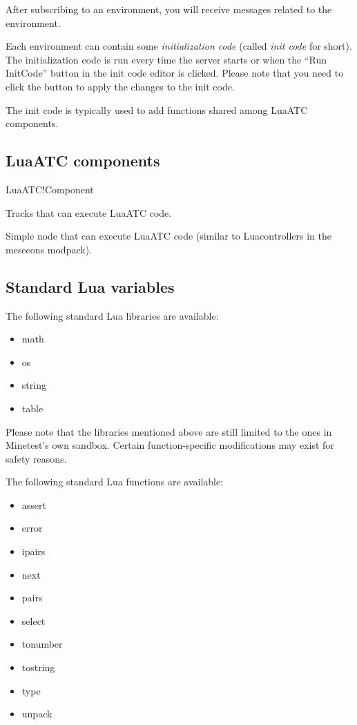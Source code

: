 After subscribing to an environment, you will receive messages related to the environment.

Each environment can contain some \textit{initialization code} (called \textit{init code} for short). The initialization code is run every time the server starts or when the ``Run InitCode'' button in the init code editor is clicked. Please note that you need to click the button to apply the changes to the init code.

The init code is typically used to add functions shared among LuaATC components.

\subsection{LuaATC components}
\begin{apidoc}{LuaATC!Component}
\item {} Tracks that can execute LuaATC code.
\item {} Simple node that can execute LuaATC code (similar to Luacontrollers in the mesecons modpack).
\end{apidoc}

\subsection{Standard Lua variables}
The following standard Lua libraries are available:
\begin{itemize} \ttfamily
\item math
\item os
\item string
\item table
\end{itemize}

Please note that the libraries mentioned above are still limited to the ones in Minetest's own sandbox. Certain function-specific modifications may exist for safety reasons.

The following standard Lua functions are available:
\begin{itemize} \ttfamily
\item assert
\item error
\item ipairs
\item next
\item pairs
\item select
\item tonumber
\item tostring
\item type
\item unpack
\end{itemize}

